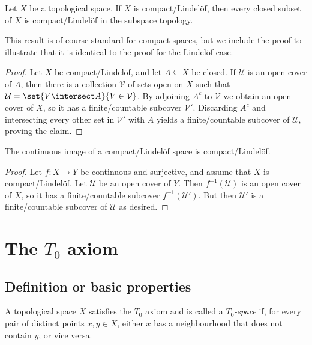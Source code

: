 \documentclass[article, a4paper, 11pt, oneside]{memoir}
\numberwithin{equation}{chapter}
\newcommand{\preim}{^{-1}}
\newcommand{\calU}{\mathcal{U}}
\newcommand{\calV}{\mathcal{V}}
\begin{document}
\begin{proposition}
    \label{thm:compact-Lindelof-closed-subset}
    Let $X$ be a topological space. If $X$ is compact/Lindelöf, then every closed subset of $X$ is compact/Lindelöf in the subspace topology.
\end{proposition}
%
This result is of course standard for compact spaces, but we include the proof to illustrate that it is identical to the proof for the Lindelöf case.

\begin{proof}
    Let $X$ be compact/Lindelöf, and let $A \subseteq X$ be closed. If $\calU$ is an open cover of $A$, then there is a collection $\calV$ of sets open on $X$ such that $\calU = \set{V \intersect A}{V \in \calV}$. By adjoining $A^c$ to $\calV$ we obtain an open cover of $X$, so it has a finite/countable subcover $\calV'$. Discarding $A^c$ and intersecting every other set in $\calV'$ with $A$ yields a finite/countable subcover of $\calU$, proving the claim.
\end{proof}


\begin{proposition}
    The continuous image of a compact/Lindelöf space is compact/Lindelöf.
\end{proposition}

\begin{proof}
    Let $f \colon X \to Y$ be continuous and surjective, and assume that $X$ is compact/Lindelöf. Let $\calU$ be an open cover of $Y$. Then $f\preim(\calU)$ is an open cover of $X$, so it has a finite/countable subcover $f\preim(\calU')$. But then $\calU'$ is a finite/countable subcover of $\calU$ as desired.
\end{proof}



\chapter[The T0 axiom]{The $T_0$ axiom}

\section{Definition or basic properties}

\begin{definition}
    A topological space $X$ satisfies the $T_0$ axiom and is called a \emph{$T_0$-space} if, for every pair of distinct points $x,y \in X$, either $x$ has a neighbourhood that does not contain $y$, or vice versa.
\end{definition}
\end{document}
